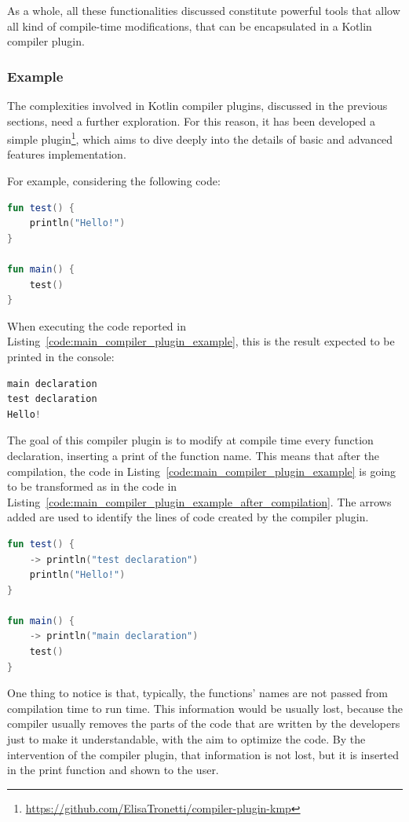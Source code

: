 As a whole, all these functionalities discussed constitute powerful tools that allow all kind of compile-time modifications, that can be encapsulated in a Kotlin compiler plugin.

\subsubsection{Example}\label{section:compiler_plugin_example}
The complexities involved in Kotlin compiler plugins, discussed in the previous sections, need a further exploration. For this reason, it has been developed a simple plugin\footnote{\url{https://github.com/ElisaTronetti/compiler-plugin-kmp}}, which aims to dive deeply into the details of basic and advanced features implementation.

For example, considering the following code:
\begin{lstlisting}[caption={Kotlin code without the modification of the compiler plugin created as an example}, captionpos=b, language=Kotlin, label={code:main_compiler_plugin_example}]
fun test() {
    println("Hello!")
}
    
fun main() {
    test()
}
\end{lstlisting}
When executing the code reported in Listing~\ref{code:main_compiler_plugin_example}, this is the result expected to be printed in the console:
\begin{lstlisting}[caption={Output of the execution of Listing~\ref{code:main_compiler_plugin_example} with the application of the compiler plugin created as an example}, captionpos=b, language=Kotlin, label={code:output_main_compiler_plugin_example}]
main declaration
test declaration
Hello!
\end{lstlisting}
The goal of this compiler plugin is to modify at compile time every function declaration, inserting a print of the function name. This means that after the compilation, the code in Listing~\ref{code:main_compiler_plugin_example} is going to be transformed as in the code in Listing~\ref{code:main_compiler_plugin_example_after_compilation}. The arrows added are used to identify the lines of code created by the compiler plugin.
\begin{lstlisting}[caption={Kotlin code with the modification of the compiler plugin created as an example}, captionpos=b, language=Kotlin, escapechar=\$, label={code:main_compiler_plugin_example_after_compilation}]
fun test() {
    -> println("test declaration")
    println("Hello!")
}

fun main() {
    -> println("main declaration")
    test()
}
\end{lstlisting}
One thing to notice is that, typically, the functions' names are not passed from compilation time to run time. This information would be usually lost, because the compiler usually removes the parts of the code that are written by the developers just to make it understandable, with the aim to optimize the code. By the intervention of the compiler plugin, that information is not lost, but it is inserted in the print function and shown to the user.

